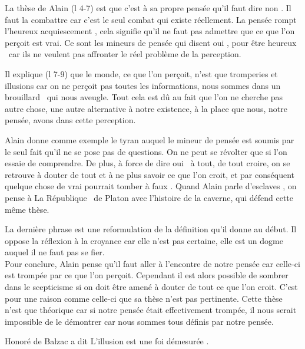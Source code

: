 \documentclass[a4paper,11pt]{article}
\begin{document}
La thèse de Alain (l 4-7) est que c'est à sa propre pensée qu'il faut dire \og non \fg. Il faut la combattre car c'est le seul combat qui existe réellement. La pensée \og rompt l'heureux acquiescement \fg, cela signifie qu'il ne faut pas admettre que ce que l'on perçoit est vrai. Ce sont les mineurs de pensée qui disent \og oui \fg, pour être \og heureux \fg\ car ils ne veulent pas affronter le réel problème de la perception.

Il explique (l 7-9) que le monde, ce que l'on perçoit, n'est que tromperies et illusions car on ne perçoit pas toutes les informations, nous sommes dans un \og brouillard \fg\ qui nous aveugle. Tout cela est dû au fait que l'on ne cherche pas autre chose, une autre alternative à notre existence, à la place que nous, notre pensée, avons dans cette perception.

Alain donne comme exemple le tyran auquel le mineur de pensée est soumis par le seul fait qu'il ne se pose pas de questions. On ne peut se révolter que si l'on essaie de comprendre. De plus, à  force de dire \og oui \fg\ à tout, de tout croire, on se retrouve à douter de tout et à ne plus savoir ce que l'on croit, et par conséquent quelque chose de vrai pourrait \og tomber à faux \fg. Quand Alain parle d'\og esclaves \fg, on pense à \og La République \fg\ de Platon avec l'histoire de la caverne, qui défend cette même thèse.

La dernière phrase est une reformulation de la définition qu'il donne au début. Il oppose la réflexion à la croyance car elle n'est pas certaine, elle est un dogme auquel il ne faut pas se fier.\\

Pour conclure, Alain pense qu'il faut aller à l'encontre de notre pensée car celle-ci est trompée par ce que l'on perçoit. Cependant il est alors possible de sombrer dans le scepticisme si on doit être amené à douter de tout ce que l'on croit. C'est pour une raison comme celle-ci que sa thèse n'est pas pertinente. Cette thèse n'est que théorique car si notre pensée était effectivement trompée, il nous serait impossible de le démontrer car nous sommes tous définis par notre pensée.

Honoré de Balzac a dit \og L'illusion est une foi démesurée \fg.
\end{document}
